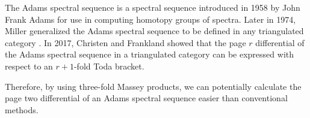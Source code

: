 The Adams spectral sequence is a spectral sequence introduced in 1958 by John Frank Adams for use in computing homotopy groups of spectra. Later in 1974, Miller generalized the Adams spectral sequence to be defined in any triangulated category \cite[Chapter I]{Miller_1975}. In 2017, Christen and Frankland \cite[Section 4, Section 6]{Christensen-Frankland_2017} showed that the page \( r \) differential of the Adams spectral sequence in a triangulated category can be expressed with respect to an \( r + 1 \)-fold Toda bracket.

Therefore, by using three-fold Massey products, we can potentially calculate the page two differential of an Adams spectral sequence easier than conventional methods.
